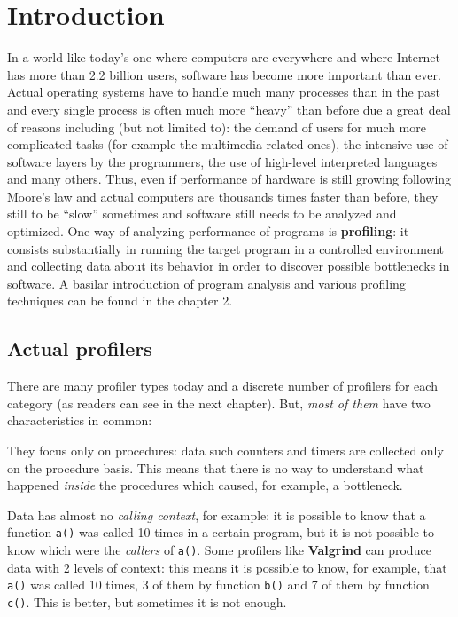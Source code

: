 \documentclass[a4paper,10pt]{report}
\begin{document}
\tableofcontents

\chapter{Introduction}

In a world like today's one where computers are everywhere and where
\mbox{Internet} has more than 2.2 billion users, software has become more
important than ever. Actual operating systems have to handle much many
processes than in the past and every single process is often much more ``heavy''
than before due a great deal of reasons including (but not limited to): the
demand of users for much more complicated tasks (for example the multimedia
related ones), the intensive use of software layers by the programmers, the use
of high-level interpreted languages and many others. Thus, even if performance
of hardware is still growing following Moore's law and actual computers are
thousands times faster than before, they still to be ``slow'' sometimes and
software still needs to be analyzed and optimized. One way of analyzing
performance of programs is \textbf{profiling}: it consists substantially in
running the target program in a controlled environment and collecting data about
its behavior in order to discover possible bottlenecks in software. A basilar
introduction of program analysis and various profiling techniques can be found
in the chapter 2.

\section{Actual profilers}

There are many profiler types today and a discrete number of profilers for
each category (as readers can see in the next chapter). But, \emph{most of them}
have two characteristics in common:

\begin{itemize*}

\item They focus only on procedures: data such counters and timers are collected
only on the procedure basis. This means that there is no way to understand what
happened \emph{inside} the procedures which caused, for example, a bottleneck.

\item Data has almost no \emph{calling context}, for example: it is possible to know that
a function \verb|a()| was called 10 times in a certain program, but it is not possible to know which were the \emph{callers} of \verb|a()|. Some profilers like \textbf{Valgrind} can
produce data with 2 levels of context: this means it is possible to know, for
example, that \verb|a()| was called 10 times, 3 of them by function
\verb|b()| and 7 of them by function \verb|c()|. This is better, but sometimes
it is not enough.

\end{itemize*}
\end{document}
